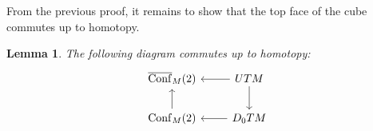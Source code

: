 \documentclass{scrartcl}
\theoremstyle{plain}
\newtheorem{lemma}[theorem]{Lemma}
\theoremstyle{definition}
\DeclareMathOperator{\cofib}{cofib}
\DeclareMathOperator{\Conf}{Conf}
\DeclareMathOperator{\cConf}{\overline{Conf}}
\begin{document}

From the previous proof, it remains to show that the top face of the cube commutes up to homotopy. 
\begin{lemma}\label{lem:intersection-product-via-cfg-spc-aid}
    The following diagram commutes up to homotopy:
    \[
        \begin{tikzcd}
            \cConf_M(2) & \lar UTM \dar \\
            \Conf_M(2) \uar & \lar D_0TM
        \end{tikzcd}
    \]
\end{lemma}
\end{document}
